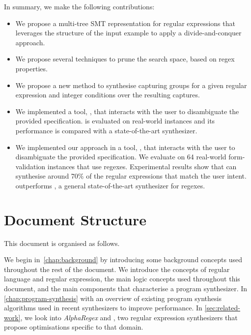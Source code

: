 In summary, we make the following contributions:

\begin{itemize}
    \item We propose a multi-tree SMT representation for regular expressions that leverages the structure of the input example to apply a divide-and-conquer approach.
    
    \item We propose several techniques to prune the search space, based on regex properties.
    
    \item We propose a new method to synthesise capturing groups for a given regular expression and integer conditions over the resulting captures.
    
    \item We implemented a tool, \Forest{}, that interacts with the user to disambiguate the provided specification. \Forest{} is evaluated on real-world instances and its performance is compared with a state-of-the-art synthesizer.
    
    \item We implemented our approach in a tool, \Forest{}, that interacts with the user to disambiguate the provided specification. We evaluate \Forest{} on 64 real-world form-validation instances that use regexes. Experimental results show that \Forest can synthesise around 70\% of the regular expressions that match the user intent.  \Forest{} outperforms \Regel, a general state-of-the-art synthesizer for regexes.
\end{itemize}

\section{Document Structure}

This document is organised as follows.

We begin in~\autoref{chap:background} by introducing some background concepts used throughout the rest of the document. We introduce the concepts of regular language and regular expression, the main logic concepts used throughout this document, and the main components that characterise a program synthesizer.
%
In \autoref{chap:program-synthesis} with an overview of existing program synthesis algorithms used in recent synthesizers to improve performance. In \autoref{sec:related-work}, we look into \textit{AlphaRegex} and \Regel, two regular expression synthesizers that propose optimisations specific to that domain.

